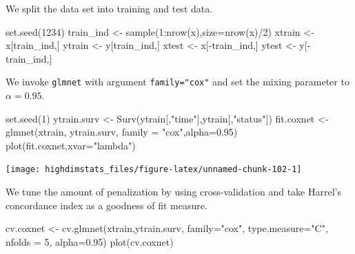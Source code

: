 \documentclass[
]{book}
\newenvironment{Shaded}{\begin{snugshade}}{\end{snugshade}}
\newcommand{\AttributeTok}[1]{\textcolor[rgb]{0.77,0.63,0.00}{#1}}
\newcommand{\DecValTok}[1]{\textcolor[rgb]{0.00,0.00,0.81}{#1}}
\newcommand{\FloatTok}[1]{\textcolor[rgb]{0.00,0.00,0.81}{#1}}
\newcommand{\FunctionTok}[1]{\textcolor[rgb]{0.00,0.00,0.00}{#1}}
\newcommand{\NormalTok}[1]{#1}
\newcommand{\OtherTok}[1]{\textcolor[rgb]{0.56,0.35,0.01}{#1}}
\newcommand{\SpecialCharTok}[1]{\textcolor[rgb]{0.00,0.00,0.00}{#1}}
\newcommand{\StringTok}[1]{\textcolor[rgb]{0.31,0.60,0.02}{#1}}
\begin{document}
We split the data set into training and test data.

\begin{Shaded}
\begin{Highlighting}[]
\FunctionTok{set.seed}\NormalTok{(}\DecValTok{1234}\NormalTok{)}
\NormalTok{train\_ind }\OtherTok{\textless{}{-}} \FunctionTok{sample}\NormalTok{(}\DecValTok{1}\SpecialCharTok{:}\FunctionTok{nrow}\NormalTok{(x),}\AttributeTok{size=}\FunctionTok{nrow}\NormalTok{(x)}\SpecialCharTok{/}\DecValTok{2}\NormalTok{)}
\NormalTok{xtrain }\OtherTok{\textless{}{-}}\NormalTok{ x[train\_ind,]}
\NormalTok{ytrain }\OtherTok{\textless{}{-}}\NormalTok{ y[train\_ind,]}
\NormalTok{xtest }\OtherTok{\textless{}{-}}\NormalTok{ x[}\SpecialCharTok{{-}}\NormalTok{train\_ind,]}
\NormalTok{ytest }\OtherTok{\textless{}{-}}\NormalTok{ y[}\SpecialCharTok{{-}}\NormalTok{train\_ind,]}
\end{Highlighting}
\end{Shaded}

We invoke \texttt{glmnet} with argument \texttt{family="cox"} and set the mixing parameter to \(\alpha=0.95\).

\begin{Shaded}
\begin{Highlighting}[]
\FunctionTok{set.seed}\NormalTok{(}\DecValTok{1}\NormalTok{)}
\NormalTok{ytrain.surv }\OtherTok{\textless{}{-}} \FunctionTok{Surv}\NormalTok{(ytrain[,}\StringTok{"time"}\NormalTok{],ytrain[,}\StringTok{"status"}\NormalTok{])}
\NormalTok{fit.coxnet }\OtherTok{\textless{}{-}} \FunctionTok{glmnet}\NormalTok{(xtrain, ytrain.surv, }\AttributeTok{family =} \StringTok{"cox"}\NormalTok{,}\AttributeTok{alpha=}\FloatTok{0.95}\NormalTok{)}
\FunctionTok{plot}\NormalTok{(fit.coxnet,}\AttributeTok{xvar=}\StringTok{"lambda"}\NormalTok{)}
\end{Highlighting}
\end{Shaded}

\begin{center}\texttt{[image: highdimstats\_files/figure-latex/unnamed-chunk-102-1]} \end{center}

We tune the amount of penalization by using cross-validation and take Harrel's concordance index as a goodness of fit measure.

\begin{Shaded}
\begin{Highlighting}[]
\NormalTok{cv.coxnet }\OtherTok{\textless{}{-}} \FunctionTok{cv.glmnet}\NormalTok{(xtrain,ytrain.surv,}
                       \AttributeTok{family=}\StringTok{"cox"}\NormalTok{,}
                       \AttributeTok{type.measure=}\StringTok{"C"}\NormalTok{,}
                       \AttributeTok{nfolds =} \DecValTok{5}\NormalTok{,}
                       \AttributeTok{alpha=}\FloatTok{0.95}\NormalTok{)}
\FunctionTok{plot}\NormalTok{(cv.coxnet)}
\end{Highlighting}
\end{Shaded}
\end{document}
